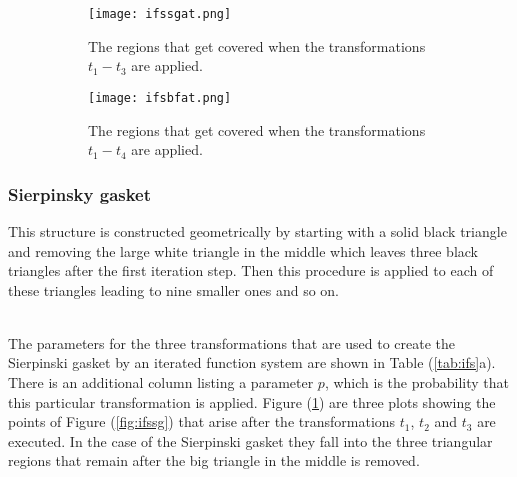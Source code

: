 \begin{figure}[h!]
	\centering
	\begin{subfigure}{0.35\linewidth}
		\centering
		\texttt{[image: ifssgat.png]}
		\caption{The regions that get covered when the transformations $t_1-t_3$ are applied.}
		\label{fig:ifssgat}
	\end{subfigure}
	\vline
	\begin{subfigure}{0.45\linewidth}
		\centering
		\texttt{[image: ifsbfat.png]}
		\caption{The regions that get covered when the transformations $t_1-t_4$ are applied.}
		\label{fig:ifsbfat}
	\end{subfigure}
	\caption{}
\end{figure}
\subsubsection{Sierpinsky gasket}
This structure is constructed geometrically by starting with a solid black triangle and removing the large white triangle in the middle which leaves three black triangles after the first iteration step.
Then this procedure is applied to each of these triangles leading to nine smaller ones and so on.
{\renewcommand{\arraystretch}{1.2}
\begin{table}[h!]
	\centering
	\caption{Parameters for Iterated Function Systems}
	\label{tab:ifs}
	\quad\vline\quad
\end{table}}
\\The parameters for the three transformations that are used to create the Sierpinski gasket by an iterated function system are shown in Table (\ref{tab:ifs}a).
There is an additional column listing a parameter $p$, which is the probability that this particular transformation is applied.
Figure (\ref{fig:ifssgat}) are three plots showing the points of Figure (\ref{fig:ifssg}) that arise after the transformations $t_1$, $t_2$ and $t_3$ are executed.
In the case of the Sierpinski gasket they fall into the three triangular regions that remain after the big triangle in the middle is removed.
